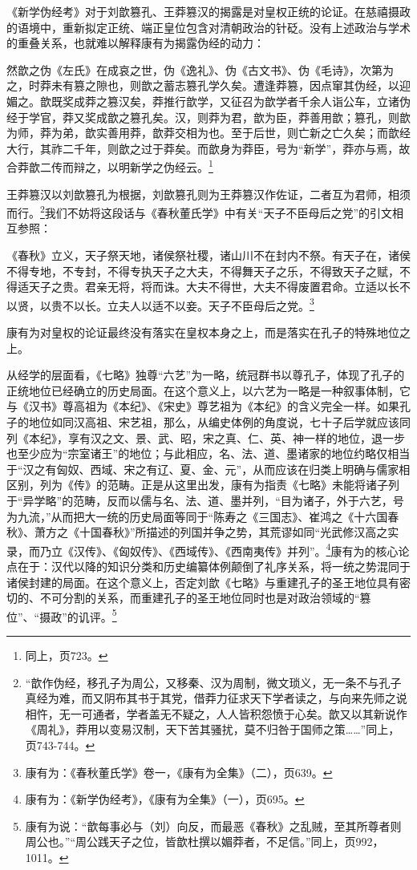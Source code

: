 \documentclass[a4paper, 12pt, openright]{ctexbook}
\renewenvironment{quote}
  {\list{}{\rightmargin2\ccwd \leftmargin2\ccwd \itemindent=2\ccwd \listparindent=2\ccwd}%
   \item\relax\small\kaishu\color{black}}
  {\endlist}
\begin{document}
《新学伪经考》对于刘歆篡孔、王莽篡汉的揭露是对皇权正统的论证。在慈禧摄政的语境中，重新拟定正统、端正皇位包含对清朝政治的针砭。没有上述政治与学术的重叠关系，也就难以解释康有为揭露伪经的动力：

\begin{quote}
然歆之伪《左氏》在成哀之世，伪《逸礼》、伪《古文书》、伪《毛诗》，次第为之，时莽未有篡之隙也，则歆之蓄志篡孔学久矣。遭逢莽篡，因点窜其伪经，以迎媚之。歆既奖成莽之篡汉矣，莽推行歆学，又征召为歆学者千余人诣公车，立诸伪经于学官，莽又奖成歆之篡孔矣。汉，则莽为君，歆为臣，莽善用歆；篡孔，则歆为师，莽为弟，歆实善用莽，歆莽交相为也。至于后世，则亡新之亡久矣；而歆经大行，其祚二千年，则歆之过于莽矣。而歆身为莽臣，号为“新学”，莽亦与焉，故合莽歆二传而辩之，以明新学之伪经云。\footnote{同上，页723。}
\end{quote}

王莽篡汉以刘歆篡孔为根据，刘歆篡孔则为王莽篡汉作佐证，二者互为君师，相须而行。\footnote{“歆作伪经，移孔子为周公，又移秦、汉为周制，微文琐义，无一条不与孔子真经为难，而又阴布其书于其党，借莽力征求天下学者读之，与向来先师之说相忤，无一可通者，学者盖无不疑之，人人皆积怨愤于心矣。歆又以其新说作《周礼》，莽用以变易汉制，天下苦其骚扰，莫不归咎于国师之策……”同上，页743-744。}我们不妨将这段话与《春秋董氏学》中有关“天子不臣母后之党”的引文相互参照：

\begin{quote}
《春秋》立义，天子祭天地，诸侯祭社稷，诸山川不在封内不祭。有天子在，诸侯不得专地，不专封，不得专执天子之大夫，不得舞天子之乐，不得致天子之赋，不得适天子之贵。君亲无将，将而诛。大夫不得世，大夫不得废置君命。立适以长不以贤，以贵不以长。立夫人以适不以妾。天子不臣母后之党。\footnote{康有为：《春秋董氏学》卷一，《康有为全集》（二），页639。}
\end{quote}

康有为对皇权的论证最终没有落实在皇权本身之上，而是落实在孔子的特殊地位之上。

从经学的层面看，《七略》独尊“六艺”为一略，统冠群书以尊孔子，体现了孔子的正统地位已经确立的历史局面。在这个意义上，以六艺为一略是一种叙事体制，它与《汉书》尊高祖为《本纪》、《宋史》尊艺祖为《本纪》的含义完全一样。如果孔子的地位如同汉高祖、宋艺祖，那么，从编史体例的角度说，七十子后学就应该同列《本纪》，享有汉之文、景、武、昭，宋之真、仁、英、神一样的地位，退一步也至少应为“宗室诸王”的地位；与此相应，名、法、道、墨诸家的地位约略仅相当于“汉之有匈奴、西域、宋之有辽、夏、金、元”，从而应该在归类上明确与儒家相区别，列为《传》的范畴。正是从这里出发，康有为指责《七略》未能将诸子列于“异学略”的范畴，反而以儒与名、法、道、墨并列，“目为诸子，外于六艺，号为九流，”从而把大一统的历史局面等同于“陈寿之《三国志》、崔鸿之《十六国春秋》、萧方之《十国春秋》”所描述的列国并争之势，其荒谬如同“光武修汉高之实录，而乃立《汉传》、《匈奴传》、《西域传》、《西南夷传》并列”。\footnote{康有为：《新学伪经考》，《康有为全集》（一），页695。}康有为的核心论点在于：汉代以降的知识分类和历史编纂体例颠倒了礼序关系，将一统之势混同于诸侯封建的局面。在这个意义上，否定刘歆《七略》与重建孔子的圣王地位具有密切的、不可分割的关系，而重建孔子的圣王地位同时也是对政治领域的“篡位”、“摄政”的讥评。\footnote{康有为说：“歆每事必与（刘）向反，而最恶《春秋》之乱贼，至其所尊者则周公也。”“周公践天子之位，皆歆杜撰以媚莽者，不足信。”同上，页992，1011。}
\end{document}
